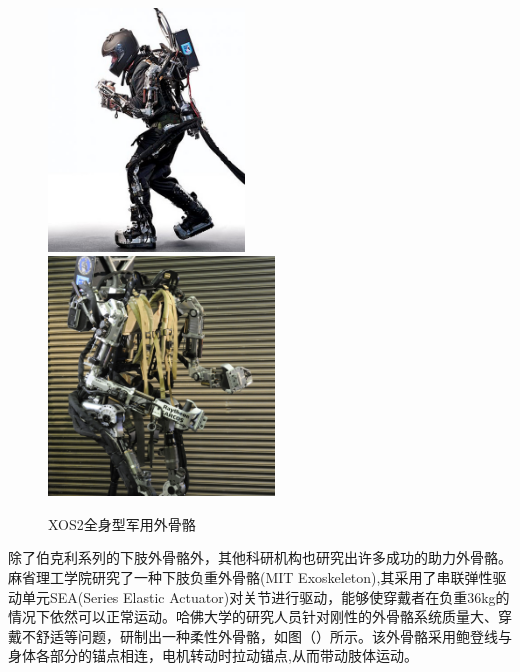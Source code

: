 \begin{figure}[htb]
    \label{fig:sub1}{\includegraphics[width=5.2cm]{fig/f6_XOS.jpg}}\quad
    \label{fig:sub2}{\includegraphics[width=6cm]{fig/f7_XOS.jpg}}
    \caption{XOS2全身型军用外骨骼\cite{p8}}
    \label{fig:subfigs}
\end{figure}

除了伯克利系列的下肢外骨骼外，其他科研机构也研究出许多成功的助力外骨骼。麻省理工学院研究了一种下肢负重外骨骼\cite{p11}(MIT Exoskeleton),其采用了串联弹性驱动单元SEA(Series Elastic Actuator)对关节进行驱动，能够使穿戴者在负重36kg的情况下依然可以正常运动。哈佛大学的研究人员针对刚性的外骨骼系统质量大、穿戴不舒适等问题，研制出一种柔性外骨骼\cite{p12}，如图（）所示。该外骨骼采用鲍登线与身体各部分的锚点相连，电机转动时拉动锚点,从而带动肢体运动。

